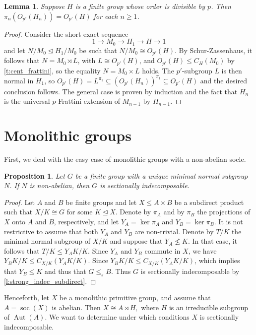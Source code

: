 \documentclass[a4paper,10pt]{amsart}
\theoremstyle{plain}
\newtheorem{lemma}[thm]{Lemma}
\newtheorem{proposition}[thm]{Proposition}
\theoremstyle{definition}
\DeclareMathOperator{\soc}{soc}
\DeclareMathOperator{\aut}{Aut}
\begin{document}
\begin{lemma}\label{l:o_p'}
    Suppose $H$ is a finite group whose order is divisible by $p$. Then $\pi_n(O_{p'}(H_n)) = O_{p'}(H)$ for each $n\geq 1$.
\end{lemma}
\begin{proof}
    Consider the short exact sequence
    \[1 \rightarrow M_0 \rightarrow H_1 \rightarrow H \rightarrow 1\]
    and let $N/M_0 \unlhd H_1/M_0$ be such that $N/M_0 \cong O_{p'}(H)$. By Schur-Zassenhaus, it follows that $N=M_0 \rtimes L$, with $L \cong O_{p'}(H)$, and  $O_{p'}(H)\leq C_H(M_0)$ by \cref{t:cent_frattini}, so the equality $N=M_0 \times L$ holds. The $p'$-subgroup $L$ is then normal in $H_1$, so $O_{p'}(H) = L^{\pi_1} \subseteq (O_{p'}(H_n))^{\pi_1}\subseteq O_{p'}(H)$ and the desired conclusion follows. The general case is proven by induction and the fact that $H_n$ is the universal $p$-Frattini extension of $M_{n-1}$ by $H_{n-1}$.
\end{proof}

\section{Monolithic groups}\label{sec:monolithic}

First, we deal with the easy case of monolithic groups with a non-abelian socle.

\begin{proposition}\label{p:mono_non-abelian}
	Let $G$ be a finite group with a unique minimal normal subgroup $N$. If $N$ is non-abelian, then $G$ is sectionally indecomposable.
\end{proposition}
\begin{proof}
	Let $A$ and $B$ be finite groups and let $X \leq A \times B$ be a subdirect product such that $X/K \cong G$ for some $K \unlhd X$. Denote by $\pi_A$ and by $\pi_B$ the projections of $X$ onto $A$ and $B$, respectively, and let $Y_A = \ker \pi_A$ and $Y_B = \ker \pi_B$. It is not restrictive to assume that both $Y_A$ and $Y_B$ are non-trivial. Denote by $T/K$ the minimal normal subgroup of $X/K$ and suppose that $Y_A \not\leq K$. In that case, it follows that $T/K \leq Y_AK/K$. Since $Y_A$ and $Y_B$ commute in $X$, we have $Y_BK/K \leq C_{X/K}(Y_AK/K)$. Since $Y_BK/K \leq C_{X/K}(Y_AK/K)$,  which implies that $Y_B \leq K$ and thus that $G \leq_s B$.  Thus $G$ is sectionally indecomposable by \cref{l:strong_indec_subdirect}.
\end{proof}

Henceforth, let $X$ be a monolithic primitive group, and assume that $A=\soc(X)$ is abelian. Then $X\cong A\rtimes H,$ where $H$ is an irreducible subgroup of $\aut(A).$ We want to determine under which conditions $X$ is sectionally indecomposable.
\end{document}
